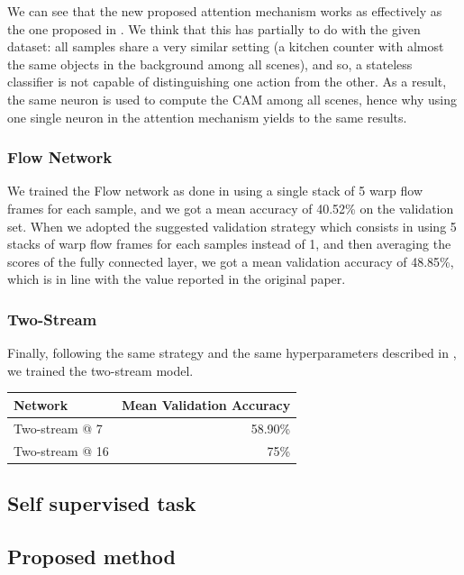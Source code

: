 \documentclass[10pt,twocolumn,letterpaper]{article}
\begin{document}
We can see that the new proposed attention mechanism works as effectively as the one proposed in \cite{Ego-RNN}. We think that this has partially to do with the given dataset: all samples share a very similar setting (a kitchen counter with almost the same objects in the background among all scenes), and so, a stateless classifier is not capable of distinguishing one action from the other. As a result, the same neuron is used to compute the CAM among all scenes, hence why using one single neuron in the attention mechanism yields to the same results.

\subsubsection{Flow Network}

We trained the Flow network as done in \cite{Ego-RNN} using a single stack of 5 warp flow frames for each sample, and we got a mean accuracy of 40.52\% on the validation set. When we adopted the suggested validation strategy which consists in using 5 stacks of warp flow frames for each samples instead of 1, and then averaging the scores of the fully connected layer, we got a mean validation accuracy of 48.85\%, which is in line with the value reported in the original paper.

\subsubsection{Two-Stream}

Finally, following the same strategy and the same hyperparameters described in \cite{Ego-RNN}, we trained the two-stream model.

\vspace{12pt} \noindent
\begin{tabular}{l|r}
	Network & Mean Validation Accuracy \\
	\hline
	Two-stream @ 7 & 58.90\% \\
	Two-stream @ 16 & 75\%
\end{tabular} \vspace{6pt}

\subsection{Self supervised task}

\subsection{Proposed method}
\end{document}
